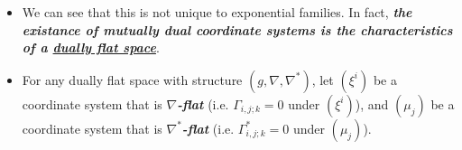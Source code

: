 \documentclass[11pt]{article}
\begin{document}
\begin{itemize}
\begin{remark}
\begin{enumerate}
%
\end{enumerate}
\end{remark}

\item We can see that this is not unique to exponential families. In fact, \emph{\textbf{the existance of mutually dual coordinate systems is the characteristics of a \underline{dually flat space}}}.

\item \begin{definition} 
For any dually flat space with structure $(g, \nabla, \nabla^{*})$, let $(\xi^i)$  be a coordinate system that is \emph{\textbf{$\nabla$-flat}} (i.e. $\Gamma_{i,j;k} = 0$ under $(\xi^i)$), and $(\mu_j)$ be a coordinate system that  is \emph{\textbf{$\nabla^{*}$-flat}} (i.e. $\Gamma_{i,j;k}^{*} = 0$ under $(\mu_j)$).


\end{definition}
\end{itemize}
\end{document}
